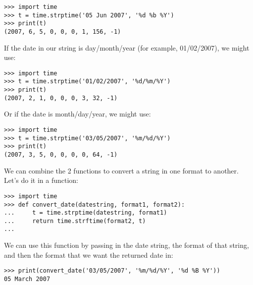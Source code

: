 \begin{Verbatim}[frame=single]
>>> import time
>>> t = time.strptime('05 Jun 2007', '%d %b %Y')
>>> print(t)
(2007, 6, 5, 0, 0, 0, 1, 156, -1)
\end{Verbatim}

\noindent
If the date in our string is day/month/year (for example, 01/02/2007), we might use:

\begin{Verbatim}[frame=single]
>>> import time
>>> t = time.strptime('01/02/2007', '%d/%m/%Y')
>>> print(t)
(2007, 2, 1, 0, 0, 0, 3, 32, -1)
\end{Verbatim}

\noindent
Or if the date is month/day/year, we might use:

\begin{Verbatim}[frame=single]
>>> import time
>>> t = time.strptime('03/05/2007', '%m/%d/%Y')
>>> print(t)
(2007, 3, 5, 0, 0, 0, 0, 64, -1)
\end{Verbatim}

\noindent
We can combine the 2 functions to convert a string in one format to another. Let's do it in a function:

\begin{Verbatim}[frame=single]
>>> import time
>>> def convert_date(datestring, format1, format2):
...     t = time.strptime(datestring, format1)
...     return time.strftime(format2, t)
...
\end{Verbatim}

\noindent
We can use this function by passing in the date string, the format of that string, and then the format that we want the returned date in:

\begin{Verbatim}[frame=single]
>>> print(convert_date('03/05/2007', '%m/%d/%Y', '%d %B %Y'))
05 March 2007
\end{Verbatim}

\newpage
